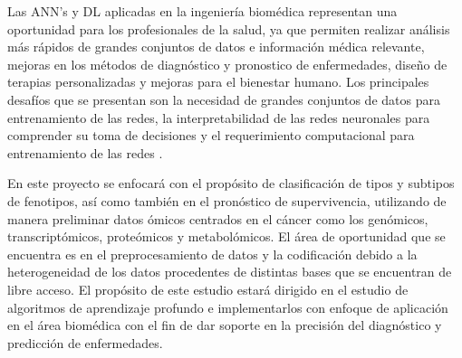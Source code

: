 Las ANN’s y DL aplicadas en la ingeniería biomédica representan una oportunidad para los profesionales de la salud, ya que permiten realizar análisis más rápidos de grandes conjuntos de datos e información médica relevante, mejoras en los métodos de diagnóstico y pronostico de enfermedades, diseño de terapias personalizadas y mejoras para el bienestar humano. Los principales desafíos que se presentan son la necesidad de grandes conjuntos de datos para entrenamiento de las redes, la interpretabilidad de las redes neuronales para comprender su toma de decisiones y el requerimiento computacional para entrenamiento de las redes \citep{sarmiento2020aplicaciones}.

En este proyecto se enfocará con el propósito de clasificación de tipos y subtipos de fenotipos, así como también en el pronóstico de supervivencia, utilizando de manera preliminar datos ómicos centrados en el cáncer como los genómicos, transcriptómicos, proteómicos y metabolómicos. El área de oportunidad que se encuentra es en el preprocesamiento de datos y la codificación debido a la heterogeneidad de los datos procedentes de distintas bases que se encuentran de libre acceso. El propósito de este estudio estará dirigido en el estudio de algoritmos de aprendizaje profundo e implementarlos con enfoque de aplicación en el área biomédica con el fin de dar soporte en la precisión del diagnóstico y predicción de enfermedades.